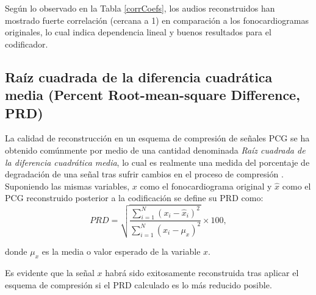 Según lo observado en la Tabla \ref{corrCoefs}, los audios reconstruidos han mostrado fuerte correlación (cercana a 1) en comparación a los fonocardiogramas originales, lo cual indica dependencia lineal y buenos resultados para el codificador. 

\subsection{Raíz cuadrada de la diferencia cuadrática media (Percent Root-mean-square Difference, PRD)}

La calidad de reconstrucción en un esquema de compresión de señales PCG se ha obtenido comúnmente por medio de una cantidad denominada \emph{Raíz cuadrada de la diferencia cuadrática media}, lo cual es realmente una medida del porcentaje de degradación de una señal tras sufrir cambios en el proceso de compresión \cite[]{Blanco-Velasco2005}. Suponiendo las mismas variables, $x$ como el fonocardiograma original y $\hat{x}$ como el PCG reconstruido posterior a la codificación se define su PRD como:
\begin{equation}
	PRD = \sqrt{ \frac{\displaystyle \sum_{i=1}^{N} (x_{i}-\hat{x}_{i})^2}{\displaystyle \sum_{i=1}^{N} (x_{i}-\mu_{x})^2} } \times 100,
\end{equation}

donde $\mu_{x}$ es la media o valor esperado de la variable $x$.

Es evidente que la señal $x$ habrá sido exitosamente reconstruida tras aplicar el esquema de compresión si el PRD calculado es lo más reducido posible. 

